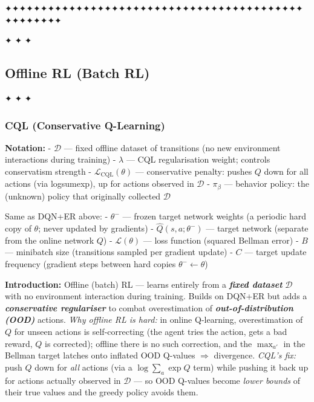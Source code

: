 \documentclass[11pt]{article}
\begin{document}
    ✦✦✦✦✦✦✦✦✦✦✦✦✦✦✦✦✦✦✦✦✦✦✦✦✦✦✦✦✦✦✦✦✦✦✦✦✦✦✦✦✦✦✦✦✦✦✦✦✦✦

    \clearpage

✦ ✦ ✦

\subsection{Offline RL (Batch RL)}\label{offline-rl-batch-rl}

✦ ✦ ✦

    \label{cql}

    \subsubsection{CQL (Conservative
Q-Learning)}\label{cql-conservative-q-learning}

    \textbf{Notation:} - \(\mathcal{D}\) --- fixed offline dataset of
transitions (no new environment interactions during training) -
\(\lambda\) --- CQL regularisation weight; controls conservatism
strength - \(\mathcal{L}_\text{CQL}(\theta)\) --- conservative penalty:
pushes \(Q\) down for all actions (via logsumexp), up for actions
observed in \(\mathcal{D}\) - \(\pi_\beta\) --- behavior policy: the
(unknown) policy that originally collected \(\mathcal{D}\)

Same as DQN+ER above: - \(\theta^-\) --- frozen target network weights
(a periodic hard copy of \(\theta\); never updated by gradients) -
\(\hat{Q}(s,a;\theta^-)\) --- target network (separate from the online
network \(Q\)) - \(\mathcal{L}(\theta)\) --- loss function (squared
Bellman error) - \(B\) --- minibatch size (transitions sampled per
gradient update) - \(C\) --- target update frequency (gradient steps
between hard copies \(\theta^- \leftarrow \theta\))

    \label{intro-4-8}

    \textbf{Introduction:} Offline (batch) RL --- learns entirely from a
\textbf{\emph{fixed dataset}} \(\mathcal{D}\) with no environment
interaction during training. Builds on DQN+ER but adds a
\textbf{\emph{conservative regulariser}} to combat overestimation of
\textbf{\emph{out-of-distribution (OOD)}} actions. \emph{Why offline RL
is hard:} in online Q-learning, overestimation of \(Q\) for unseen
actions is self-correcting (the agent tries the action, gets a bad
reward, \(Q\) is corrected); offline there is no such correction, and
the \(\max_{a'}\) in the Bellman target latches onto inflated OOD
Q-values \(\Rightarrow\) divergence. \emph{CQL's fix:} push \(Q\) down
for \emph{all} actions (via a \(\log\sum_a \exp Q\) term) while pushing
it back up for actions actually observed in \(\mathcal{D}\) --- so OOD
Q-values become \emph{lower bounds} of their true values and the greedy
policy avoids them.
\end{document}
